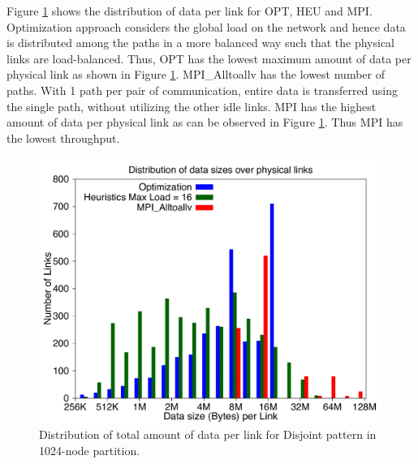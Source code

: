 Figure \ref{fig:loaddata_histo} shows the distribution of data per link for OPT, HEU and MPI. Optimization approach considers the global load on the network and hence data is distributed among the paths in a more balanced way such that the physical links are load-balanced. Thus, OPT has the lowest maximum amount of data per physical link as shown in Figure \ref{fig:loaddata_histo}. MPI\_Alltoallv has the lowest number of paths. With 1 path per pair of communication, entire data is transferred using the single path, without utilizing the other idle links. %
MPI has the highest amount of data per physical link as can be observed in Figure \ref{fig:loaddata_histo}. Thus MPI has the lowest throughput.
\begin{figure}[!htb]
\vspace{-0.15in}
\centering
\includegraphics[scale=0.27]{figures/loaddata_histo.pdf}
\vspace{-0.15in}
\caption{\small Distribution of total amount of data per link for Disjoint pattern in 1024-node partition.}
\vspace{-0.15in}
\label{fig:loaddata_histo}
\end{figure}



